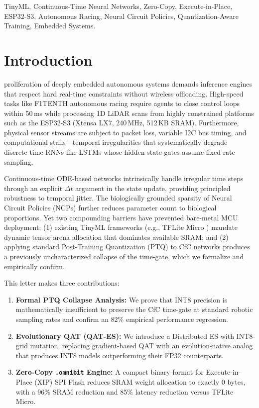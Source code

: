 \documentclass[lettersize,journal]{IEEEtran}
\begin{document}
\begin{IEEEkeywords}
TinyML, Continuous-Time Neural Networks, Zero-Copy, Execute-in-Place, ESP32-S3, Autonomous Racing, Neural Circuit Policies, Quantization-Aware Training, Embedded Systems.
\end{IEEEkeywords}

\section{Introduction}
 proliferation of deeply embedded autonomous systems demands inference engines that respect hard real-time constraints without wireless offloading. High-speed tasks like F1TENTH autonomous racing \cite{okelly2020f1tenth} require agents to close control loops within 50\,ms while processing 1D LiDAR scans from highly constrained platforms such as the ESP32-S3 (Xtensa LX7, 240\,MHz, 512\,KB SRAM). Furthermore, physical sensor streams are subject to packet loss, variable I2C bus timing, and computational stalls---temporal irregularities that systematically degrade discrete-time RNNs like LSTMs \cite{hochreiter1997lstm} whose hidden-state gates assume fixed-rate sampling.

Continuous-time ODE-based networks \cite{hasani2021liquid, hasani2022closed, chen2018neuralode} intrinsically handle irregular time steps through an explicit $\Delta t$ argument in the state update, providing principled robustness to temporal jitter. The biologically grounded sparsity of Neural Circuit Policies (NCPs) \cite{lechner2020neural} further reduces parameter count to biological proportions. Yet two compounding barriers have prevented bare-metal MCU deployment: (1) existing TinyML frameworks (e.g., TFLite Micro \cite{david2021tensorflow}) mandate dynamic tensor arena allocation that dominates available SRAM; and (2) applying standard Post-Training Quantization (PTQ) \cite{hubara2017qnn} to CfC networks produces a previously uncharacterized collapse of the time-gate, which we formalize and empirically confirm.

\noindent This letter makes three contributions:
\begin{enumerate}
    \item \textbf{Formal PTQ Collapse Analysis:} We prove that INT8 precision is mathematically insufficient to preserve the CfC time-gate at standard robotic sampling rates and confirm an 82\% empirical performance regression.
    \item \textbf{Evolutionary QAT (QAT-ES):} We introduce a Distributed ES with INT8-grid mutation, replacing gradient-based QAT with an evolution-native analog that produces INT8 models outperforming their FP32 counterparts.
    \item \textbf{Zero-Copy \texttt{.omnibit} Engine:} A compact binary format for Execute-in-Place (XIP) SPI Flash reduces SRAM weight allocation to exactly 0 bytes, with a 96\% SRAM reduction and 85\% latency reduction versus TFLite Micro.
\end{enumerate}
\end{document}
